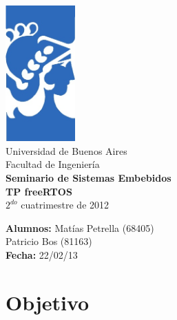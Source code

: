 \documentclass[a4paper,12pt]{article}
\begin{document}
\thispagestyle{empty}

\begin{center}
	\includegraphics[width=0.2\textwidth,angle=0]{./imagenes/logo-facu.png}\\
	\huge{{Universidad de Buenos Aires}}\\
	\huge{{Facultad de Ingeniería}}\\
	\vspace{2.2cm}
	\Huge{\textbf{Seminario de Sistemas Embebidos}}\\
	\vspace{0.5cm}
	\Large{\textbf{TP freeRTOS}}\\
	\vspace{1.5cm}
	\Large{$2^{do}$ cuatrimestre de 2012}\\
	\vspace{2cm}	
\end{center}

\vfill
\begin{flushright}
		\textbf{Alumnos:}  Matías Petrella (68405)\\
		 Patricio Bos (81163)\\
		\textbf{Fecha:}  22/02/13\\
\end{flushright}
\newpage



\tableofcontents
\thispagestyle{empty}
\newpage

\section{Objetivo}
\end{document}

